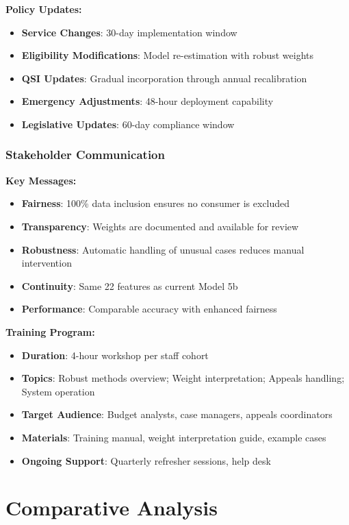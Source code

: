 \textbf{Policy Updates:}
\begin{itemize}
    \item \textbf{Service Changes}: 30-day implementation window
    \item \textbf{Eligibility Modifications}: Model re-estimation with robust weights
    \item \textbf{QSI Updates}: Gradual incorporation through annual recalibration
    \item \textbf{Emergency Adjustments}: 48-hour deployment capability
    \item \textbf{Legislative Updates}: 60-day compliance window
\end{itemize}

\subsubsection{Stakeholder Communication}

\textbf{Key Messages:}
\begin{itemize}
    \item \textbf{Fairness}: 100\% data inclusion ensures no consumer is excluded
    \item \textbf{Transparency}: Weights are documented and available for review
    \item \textbf{Robustness}: Automatic handling of unusual cases reduces manual intervention
    \item \textbf{Continuity}: Same 22 features as current Model 5b
    \item \textbf{Performance}: Comparable accuracy with enhanced fairness
\end{itemize}

\textbf{Training Program:}
\begin{itemize}
    \item \textbf{Duration}: 4-hour workshop per staff cohort
    \item \textbf{Topics}: Robust methods overview; Weight interpretation; Appeals handling; System operation
    \item \textbf{Target Audience}: Budget analysts, case managers, appeals coordinators
    \item \textbf{Materials}: Training manual, weight interpretation guide, example cases
    \item \textbf{Ongoing Support}: Quarterly refresher sessions, help desk
\end{itemize}

\section{Comparative Analysis}

